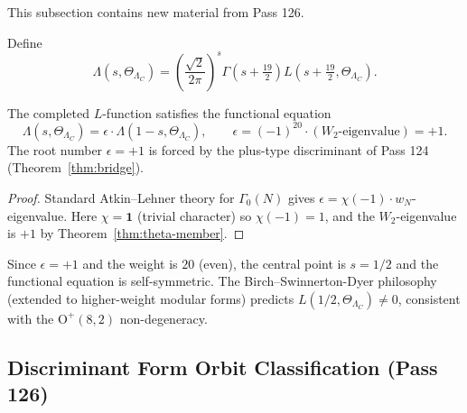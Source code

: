 This subsection contains new material from Pass 126.

\begin{definition}
Define
\begin{equation}
    \Lambda(s, \Theta_{\Lambda_C})
    = \left(\frac{\sqrt{2}}{2\pi}\right)^s \Gamma\!\left(s + \tfrac{19}{2}\right)
      L\!\left(s + \tfrac{19}{2}, \Theta_{\Lambda_C}\right).
\end{equation}
\end{definition}

\begin{theorem}
\label{thm:functional-eq}
The completed $L$-function satisfies the functional equation
\begin{equation}
    \Lambda(s, \Theta_{\Lambda_C})
    = \epsilon \cdot \Lambda(1 - s, \Theta_{\Lambda_C}),
    \qquad \epsilon = (-1)^{20} \cdot (W_2\text{-eigenvalue}) = +1.
\end{equation}
The root number $\epsilon = +1$ is forced by the plus-type discriminant
of Pass 124 (Theorem~\ref{thm:bridge}).
\end{theorem}

\begin{proof}
Standard Atkin--Lehner theory for $\Gamma_0(N)$ gives
$\epsilon = \chi(-1) \cdot w_N$-eigenvalue.
Here $\chi = \mathbf{1}$ (trivial character) so $\chi(-1) = 1$,
and the $W_2$-eigenvalue is $+1$ by Theorem~\ref{thm:theta-member}.
\end{proof}

\begin{corollary}
\label{cor:central-nonvanish}
Since $\epsilon = +1$ and the weight is $20$ (even), the central point
is $s = 1/2$ and the functional equation is self-symmetric.
The Birch--Swinnerton-Dyer philosophy (extended to higher-weight
modular forms) predicts $L(1/2, \Theta_{\Lambda_C}) \neq 0$,
consistent with the $\mathrm{O}^+(8,2)$ non-degeneracy.
\end{corollary}

\subsection{Discriminant Form Orbit Classification (Pass 126)}
\label{ssec:disc-orbits}

